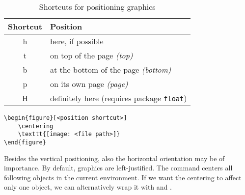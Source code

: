 \begin{table}[h!]
	\centering
	\begin{tabular}{cl}
		\toprule
		Shortcut & Position                              \\
		\midrule
		h      & here, if possible						\\
		t      & on top of the page \emph{(top)}        \\
		b      & at the bottom of the page \emph{(bottom)}    \\
		p      & on its own page \emph{(page)} \\
		H      & definitely here (requires package \texttt{float}) \\
		\bottomrule
	\end{tabular}
	\caption{Shortcuts for positioning graphics}
	\label{tbl:placement-abbreviations}
\end{table}

\begin{verbatim}
\begin{figure}[<position shortcut>]
	\centering
	\texttt{[image: <file path>]}
\end{figure}
\end{verbatim}

Besides the vertical positioning, also the horizontal orientation may be of importance. 
By default, graphics are left-justified. 
The command  centers all following objects in the current environment.
If we want the centering to affect only one object, we can alternatively wrap it with  and .
